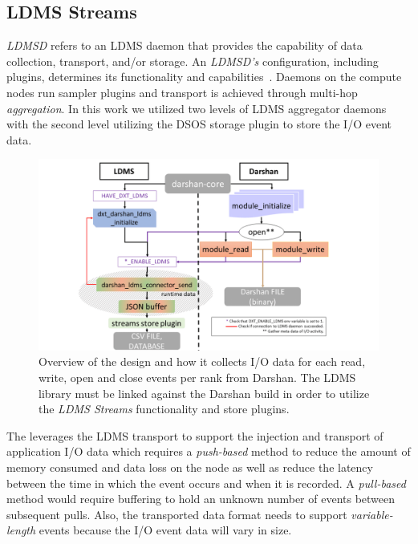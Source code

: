 \subsection{LDMS Streams}
\emph{LDMSD} refers to an LDMS daemon that provides the capability of data 
collection, transport, and/or storage. An \emph{LDMSD's} configuration, 
including plugins, determines its functionality and capabilities~\cite{ldmsgithubwiki}. 
Daemons on the compute nodes run sampler plugins and transport is achieved 
through multi-hop \emph{aggregation}. In this work we utilized two levels of 
LDMS aggregator daemons~\cite{ldmsgithubwiki} with the second level utilizing
the DSOS storage plugin to store the I/O event data.

\begin{figure}
	\centering
	\includegraphics[trim={3.5cm 0 0 0},clip,
	width=1.15\linewidth]{figs/darshan-connector.png}
	\caption{Overview of the \connector{} design and how it collects I/O data for each read, write, open and close events per rank from Darshan. The LDMS library must be linked against the Darshan build in order to utilize the \emph{LDMS Streams} functionality and store plugins.}
	\label{f:Darshan Connector}
\end{figure}

The \Darshan{} leverages the LDMS transport to support the injection and transport 
of application I/O data which requires a \emph{push-based} method to reduce the 
amount of memory consumed and data loss on the node as well as reduce the latency 
between the time in which the event occurs and when it is recorded. A \emph{pull-based} 
method would require buffering to hold an unknown number of events between subsequent 
pulls. Also, the transported data format needs to support \emph{variable-length} 
events because the I/O event data will vary in size. 

